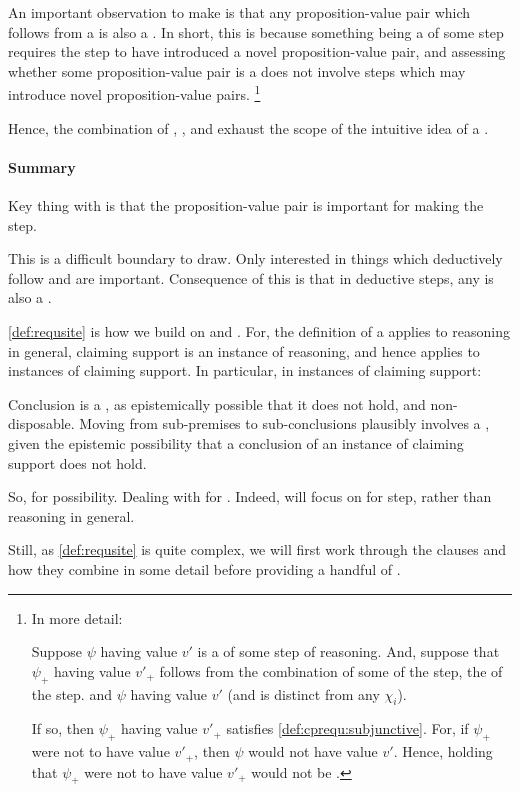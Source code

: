 \begin{note}
  An important observation to make is that any proposition-value pair which follows from a \cprequ{} is also a \cprequ{}.
  In short, this is because something being a \cprequ{} of some step requires the step to have introduced a novel proposition-value pair, and assessing whether some proposition-value pair is a \cprequ{} does not involve steps which may introduce novel proposition-value pairs.\nolinebreak
  \footnote{
    In more detail:

    Suppose \(\psi\) having value \(v'\) is a \cprequ{} of some step of reasoning.
    And, suppose that \(\psi_{+}\) having value \(v'_{+}\) follows from the combination of some  of the step, the  of the step. and \(\psi\) having value \(v'\) (and is distinct from any \(\chi_{i}\)).

    If so, then \(\psi_{+}\) having value \(v'_{+}\) satisfies \ref{def:cprequ:subjunctive}.
    For, if \(\psi_{+}\) were not to have value \(v'_{+}\), then \(\psi\) would not have value \(v'\).
    Hence, holding that \(\psi_{+}\) were not to have value \(v'_{+}\) would not be \epVAd{}.
  }

  Hence, the combination of , , and  exhaust the scope of the intuitive idea of a \requ{}.
\end{note}

\paragraph{Summary}

\begin{note}
  Key thing with  is that the proposition-value pair is important for making the step.

  This is a difficult boundary to draw.
  Only interested in things which deductively follow and are important.
  Consequence of this is that in deductive steps, any \crequ{} is also a \prequ{}.
\end{note}


\begin{note}
  \autoref{def:requsite} is how we build on \ideaS{} and \ideaCS{}.
  For, the definition of a \requ{} applies to reasoning in general, claiming support is an instance of reasoning, and hence applies to instances of claiming support.
  In particular, in instances of claiming support:
  {
    \color{reword}
    Conclusion is a \requ{}, as epistemically possible that it does not hold, and non-disposable.
    Moving from sub-premises to sub-conclusions plausibly involves a \requ{}, given the epistemic possibility that a conclusion of an instance of claiming support does not hold.

    So, \ideaS{} for possibility.
    Dealing with  for \ideaCS{}.
    Indeed, \ideaCS{} will focus on \requ{} for step, rather than reasoning in general.
  }

  Still, as \autoref{def:requsite} is quite complex, we will first work through the clauses and how they combine in some detail before providing a handful of .
\end{note}

